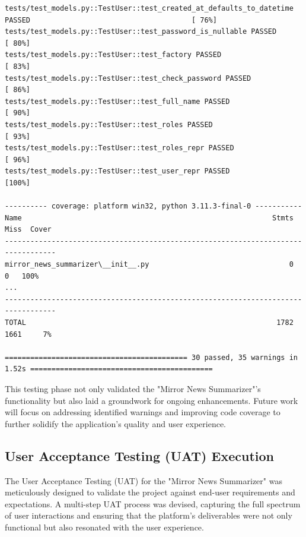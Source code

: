 \documentclass[10pt]{article}
\begin{document}
\begin{Verbatim}[fontsize=\scriptsize]
tests/test_models.py::TestUser::test_created_at_defaults_to_datetime PASSED                                      [ 76%]
tests/test_models.py::TestUser::test_password_is_nullable PASSED                                                 [ 80%]
tests/test_models.py::TestUser::test_factory PASSED                                                              [ 83%]
tests/test_models.py::TestUser::test_check_password PASSED                                                       [ 86%]
tests/test_models.py::TestUser::test_full_name PASSED                                                            [ 90%]
tests/test_models.py::TestUser::test_roles PASSED                                                                [ 93%]
tests/test_models.py::TestUser::test_roles_repr PASSED                                                           [ 96%]
tests/test_models.py::TestUser::test_user_repr PASSED                                                            [100%]

---------- coverage: platform win32, python 3.11.3-final-0 -----------
Name                                                           Stmts   Miss  Cover
----------------------------------------------------------------------------------
mirror_news_summarizer\__init__.py                                 0      0   100%
...
----------------------------------------------------------------------------------
TOTAL                                                           1782   1661     7%

=========================================== 30 passed, 35 warnings in 1.52s ===========================================
\end{Verbatim}

This testing phase not only validated the "Mirror News Summarizer"'s functionality but also laid a groundwork for ongoing enhancements. Future work will focus on addressing identified warnings and improving code coverage to further solidify the application's quality and user experience.

\subsection{User Acceptance Testing (UAT) Execution}

The User Acceptance Testing (UAT) for the "Mirror News Summarizer" was meticulously designed to validate the project against end-user requirements and expectations. A multi-step UAT process was devised, capturing the full spectrum of user interactions and ensuring that the platform's deliverables were not only functional but also resonated with the user experience.
\end{document}
